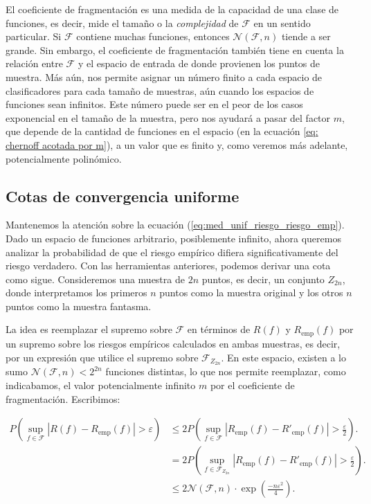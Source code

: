 \documentclass{report}
\begin{document}
El coeficiente de fragmentación es una medida de la capacidad de una clase de funciones, es decir, mide 
el tamaño o la \textit{complejidad} de \(\mathcal{F}\) en un sentido particular. Si \(\mathcal{F}\) contiene muchas funciones, entonces 
$\mathcal{N}(\mathcal{F}, n)$ tiende a ser grande. Sin embargo, el coeficiente de fragmentación también tiene en cuenta 
la relación entre \(\mathcal{F}\) y el espacio de entrada de donde provienen los puntos de muestra. Más aún, nos permite asignar un número
finito a cada espacio de clasificadores para cada tamaño de muestras, aún cuando los espacios de funciones sean infinitos. Este número puede
ser en el peor de los casos exponencial en el tamaño de la muestra, pero nos ayudará a pasar del factor $m$, que depende de la cantidad
de funciones en el espacio (en la ecuación \ref{eq: chernoff acotada por m}), a un valor que es finito y, como veremos más adelante,
potencialmente polinómico.\newline

\subsection{Cotas de convergencia uniforme}

Mantenemos la atención sobre la ecuación (\ref{eq:med_unif_riesgo_riesgo_emp}). Dado un espacio de funciones arbitrario, 
posiblemente infinito, ahora queremos analizar la probabilidad 
de que el riesgo empírico difiera significativamente del riesgo verdadero. Con las herramientas anteriores, 
podemos derivar una cota como sigue. Consideremos una muestra de \(2n\) puntos, es decir, un conjunto 
\(Z_{2n}\), donde interpretamos los primeros \(n\) puntos como la muestra original y los otros \(n\) 
puntos como la muestra fantasma.\newline

La idea es reemplazar el supremo sobre \(\mathcal{F}\) en términos de \(R(f)\) y 
\(R_{\text{emp}}(f)\) por un supremo sobre los riesgos empíricos calculados en ambas muestras, es decir, por un expresión
que utilice el supremo sobre \(\mathcal{F}_{Z_{2n}}\). En este espacio, existen a lo sumo $\mathcal{N}(\mathcal{F}, n)<2^{2n}$
funciones distintas, lo que nos permite reemplazar, como indicabamos, el valor potencialmente infinito $m$ por el coeficiente de 
fragmentación. Escribimos:\newline

\[
\begin{aligned}
P\left(\sup_{f \in \mathcal{F}} |R(f) - R_{\text{emp}}(f)| > \varepsilon\right) &\leq 
2P\left(\sup_{f \in \mathcal{F}} |R_{\text{emp}}(f) - R'_{\text{emp}}(f)| > \frac{\varepsilon}{2}\right).\\
& = 2P\left(\sup_{f \in \mathcal{F}_{Z_{2n}}} |R_{\text{emp}}(f) - R'_{\text{emp}}(f)| > \frac{\varepsilon}{2}\right).\\
& \leq 2  \mathcal{N}(\mathcal{F}, n)\cdot \exp\left(\frac{-n\varepsilon^2}{4}\right).
\end{aligned}
\]
\end{document}
